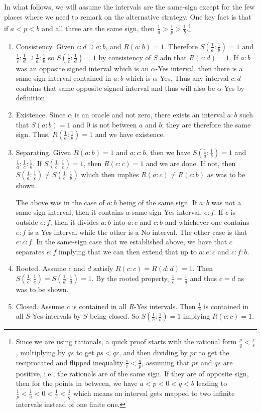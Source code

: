 \documentclass[12pt]{article}
\theoremstyle{remark}
\begin{document}
\begin{itemize}
    In what follows, we will assume the intervals are the same-sign except for the few places where we need to remark on the alternative strategy. One key fact is that if $a<p<b$ and all three are the same sign, then $\frac{1}{a} > \frac{1}{p} > \frac{1}{b}$.\footnote{Since we are using rationals, a quick proof starts with the rational form $\frac{p}{q} < \frac{r}{s}$, multiplying by $qs$ to get $ps < qr$, and then dividing by $pr$ to get the reciprocated and flipped inequality $\frac{s}{r} < \frac{q}{p}$, assuming that $pr$ and $qs$ are positive, i.e., the rationals are of the same sign. If they are of opposite sign, then for the points in between, we have $a < p < 0< q< b$ leading to $\frac{1}{p} < \frac{1}{a} < 0 < \frac{1}{b} < \frac{1}{q}$ which means an interval gets mapped to two infinite intervals instead of one finite one.}
    
    \begin{enumerate}
        \item Consistency. Given $c:d \supseteq a:b$, and $R(a:b)=1$. Therefore $S(\frac{1}{a}:\frac{1}{b}) = 1$ and $\frac{1}{c}:\frac{1}{d} \supseteq \frac{1}{a}:\frac{1}{b}$ so $S(\frac{1}{c}:\frac{1}{d})=1$ by consistency of $S$ adn that $R(c:d) = 1$. If $a:b$ was an opposite signed interval which is an $\alpha$-Yes interval, then there is a same-sign interval contained in $a:b$ which is $\alpha$-Yes. Thus any interval $c:d$ contains that same opposite signed interval and thus will also be $\alpha$-Yes by definition. 
        \item Existence. Since $\alpha$ is an oracle and not zero, there exists an interval $a:b$ such that $S(a:b)=1$ and 0 is not between $a$ and $b$; they are therefore the same sign. Thus, $R(\frac{1}{a}:\frac{1}{b})=1$ and we have existence. 
        \item Separating. Given $R(a:b)=1$ and $a:c:b$, then we have $S(\frac{1}{a}:\frac{1}{b})=1$ and $\frac{1}{a}:\frac{1}{c}:\frac{1}{b}$. If $S(\frac{1}{c}:\frac{1}{c})=1$, then $R(c:c)=1$ and we are done. If not, then $S(\frac{1}{a}:\frac{1}{c}) \neq S(\frac{1}{c}:\frac{1}{b})$ which then implies $R(a:c)\neq R(c:b)$ as was to be shown. 
        
        The above was in the case of $a:b$ being of the same sign. If $a:b$ was not a same sign interval, then it contains a same sign Yes-interval, $e:f$. If $c$ is outside $e:f$, then it divides $a:b$ into $a:c$ and $c:b$ and whichever one contains $e:f$ is a Yes interval while the other is a No interval. The other case is that $e:c:f$. In the same-sign case that we established above, we have that $c$ separates $e:f$ implying that we can then extend that up to $a:e:c$ and $c:f:b$.
        \item Rooted. Assume $c$ and $d$ satisfy $R(c:c)=R(d:d)=1$. Then $S(\frac{1}{c}:\frac{1}{c})=S(\frac{1}{d}:\frac{1}{d})=1$. By the rooted property, $\frac{1}{c} = \frac{1}{d}$ and thus $c=d$ as was to be shown. 
        \item Closed. Assume $c$ is contained in all $R$-Yes intervals. Then $\frac{1}{c}$ is contained in all $S$-Yes intervals by $S$ being closed. So $S(\frac{1}{c}:\frac{1}{c})=1$ implying $R(c:c)=1$.
    \end{enumerate}
    

\end{itemize}
\end{document}
